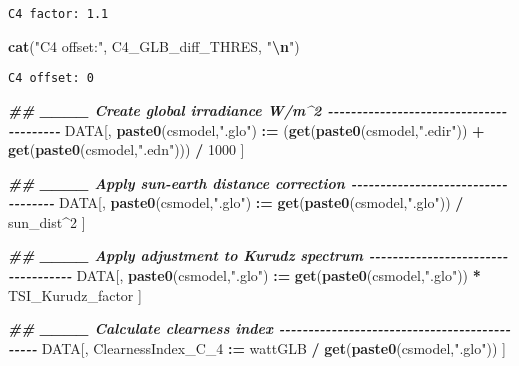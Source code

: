 \documentclass[
  10pt,
  a4paper,oneside]{article}
\newenvironment{Shaded}{\begin{snugshade}}{\end{snugshade}}
\newcommand{\DecValTok}[1]{\textcolor[rgb]{0.00,0.00,0.81}{#1}}
\newcommand{\DocumentationTok}[1]{\textcolor[rgb]{0.56,0.35,0.01}{\textbf{\textit{#1}}}}
\newcommand{\FunctionTok}[1]{\textcolor[rgb]{0.13,0.29,0.53}{\textbf{#1}}}
\newcommand{\NormalTok}[1]{#1}
\newcommand{\SpecialCharTok}[1]{\textcolor[rgb]{0.81,0.36,0.00}{\textbf{#1}}}
\newcommand{\StringTok}[1]{\textcolor[rgb]{0.31,0.60,0.02}{#1}}
\begin{document}
\begin{verbatim}
C4 factor: 1.1 
\end{verbatim}

\begin{Shaded}
\begin{Highlighting}[]
\FunctionTok{cat}\NormalTok{(}\StringTok{"C4 offset:"}\NormalTok{, C4\_GLB\_diff\_THRES, }\StringTok{"}\SpecialCharTok{\textbackslash{}n}\StringTok{"}\NormalTok{)}
\end{Highlighting}
\end{Shaded}

\begin{verbatim}
C4 offset: 0 
\end{verbatim}

\begin{Shaded}
\begin{Highlighting}[]
\DocumentationTok{\#\# \_\_\_\_ Create global irradiance W/m\^{}2  {-}{-}{-}{-}{-}{-}{-}{-}{-}{-}{-}{-}{-}{-}{-}{-}{-}{-}{-}{-}{-}{-}{-}{-}{-}{-}{-}{-}{-}{-}{-}{-}{-}{-}{-}{-}{-}{-}{-}{-}}
\NormalTok{DATA[, }\FunctionTok{paste0}\NormalTok{(csmodel,}\StringTok{".glo"}\NormalTok{) }\SpecialCharTok{:=}\NormalTok{ (}\FunctionTok{get}\NormalTok{(}\FunctionTok{paste0}\NormalTok{(csmodel,}\StringTok{".edir"}\NormalTok{)) }\SpecialCharTok{+} \FunctionTok{get}\NormalTok{(}\FunctionTok{paste0}\NormalTok{(csmodel,}\StringTok{".edn"}\NormalTok{))) }\SpecialCharTok{/} \DecValTok{1000}\NormalTok{ ]}


\DocumentationTok{\#\# \_\_\_\_ Apply sun{-}earth distance correction  {-}{-}{-}{-}{-}{-}{-}{-}{-}{-}{-}{-}{-}{-}{-}{-}{-}{-}{-}{-}{-}{-}{-}{-}{-}{-}{-}{-}{-}{-}{-}{-}{-}{-}{-}}
\NormalTok{DATA[, }\FunctionTok{paste0}\NormalTok{(csmodel,}\StringTok{".glo"}\NormalTok{) }\SpecialCharTok{:=} \FunctionTok{get}\NormalTok{(}\FunctionTok{paste0}\NormalTok{(csmodel,}\StringTok{".glo"}\NormalTok{)) }\SpecialCharTok{/}\NormalTok{ sun\_dist}\SpecialCharTok{\^{}}\DecValTok{2}\NormalTok{ ]}


\DocumentationTok{\#\# \_\_\_\_ Apply adjustment to Kurudz spectrum  {-}{-}{-}{-}{-}{-}{-}{-}{-}{-}{-}{-}{-}{-}{-}{-}{-}{-}{-}{-}{-}{-}{-}{-}{-}{-}{-}{-}{-}{-}{-}{-}{-}{-}{-}}
\NormalTok{DATA[, }\FunctionTok{paste0}\NormalTok{(csmodel,}\StringTok{".glo"}\NormalTok{) }\SpecialCharTok{:=} \FunctionTok{get}\NormalTok{(}\FunctionTok{paste0}\NormalTok{(csmodel,}\StringTok{".glo"}\NormalTok{)) }\SpecialCharTok{*}\NormalTok{ TSI\_Kurudz\_factor ]}


\DocumentationTok{\#\# \_\_\_\_ Calculate clearness index  {-}{-}{-}{-}{-}{-}{-}{-}{-}{-}{-}{-}{-}{-}{-}{-}{-}{-}{-}{-}{-}{-}{-}{-}{-}{-}{-}{-}{-}{-}{-}{-}{-}{-}{-}{-}{-}{-}{-}{-}{-}{-}{-}{-}{-}}
\NormalTok{DATA[, ClearnessIndex\_C\_4 }\SpecialCharTok{:=}\NormalTok{ wattGLB }\SpecialCharTok{/} \FunctionTok{get}\NormalTok{(}\FunctionTok{paste0}\NormalTok{(csmodel,}\StringTok{".glo"}\NormalTok{)) ]}


\end{Highlighting}
\end{Shaded}
\end{document}
